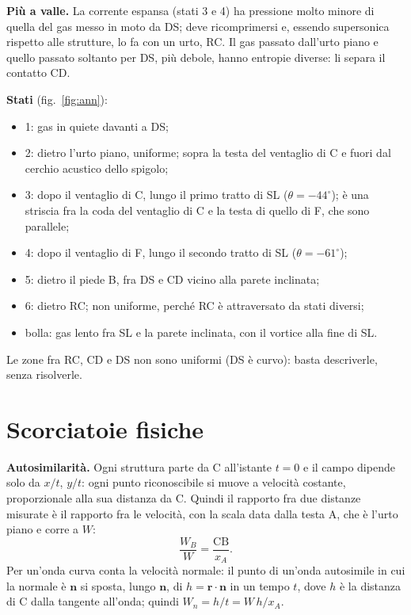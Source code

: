 \documentclass[11pt,a4paper]{article}
\begin{document}
\textbf{Più a valle.} La corrente espansa (stati 3 e 4) ha pressione molto minore di quella del gas messo in moto da
DS; deve ricomprimersi e, essendo supersonica rispetto alle strutture, lo fa con un urto, RC. Il gas passato
dall'urto piano e quello passato soltanto per DS, più debole, hanno entropie diverse: li separa il contatto CD.

\textbf{Stati} (fig.~\ref{fig:ann}):
\begin{itemize}
  \item 1: gas in quiete davanti a DS;
  \item 2: dietro l'urto piano, uniforme; sopra la testa del ventaglio di C e fuori dal cerchio acustico dello
  spigolo;
  \item 3: dopo il ventaglio di C, lungo il primo tratto di SL ($\theta=-44^\circ$); è una striscia fra la coda del
  ventaglio di C e la testa di quello di F, che sono parallele;
  \item 4: dopo il ventaglio di F, lungo il secondo tratto di SL ($\theta=-61^\circ$);
  \item 5: dietro il piede B, fra DS e CD vicino alla parete inclinata;
  \item 6: dietro RC; non uniforme, perché RC è attraversato da stati diversi;
  \item bolla: gas lento fra SL e la parete inclinata, con il vortice alla fine di SL.
\end{itemize}
Le zone fra RC, CD e DS non sono uniformi (DS è curvo): basta descriverle, senza risolverle.

\section{Scorciatoie fisiche}\label{sec:scorciatoie}
\textbf{Autosimilarità.} Ogni struttura parte da C all'istante $t=0$ e il campo dipende solo da $x/t$, $y/t$: ogni
punto riconoscibile si muove a velocità costante, proporzionale alla sua distanza da C. Quindi il rapporto fra due
distanze misurate è il rapporto fra le velocità, con la scala data dalla testa A, che è l'urto piano e corre a $W$:
\[
  \frac{W_B}{W} = \frac{\mathrm{CB}}{x_A}.
\]
Per un'onda curva conta la velocità normale: il punto di un'onda autosimile in cui la normale è $\mathbf n$ si sposta,
lungo $\mathbf n$, di $h=\mathbf r\cdot\mathbf n$ in un tempo $t$, dove $h$ è la distanza di C dalla tangente
all'onda; quindi $W_n=h/t=W\,h/x_A$.
\end{document}
